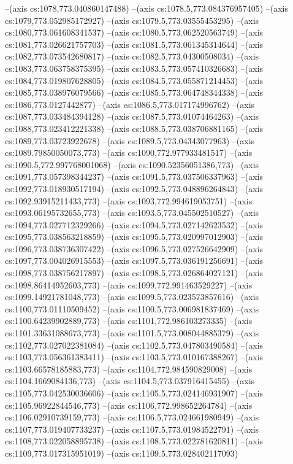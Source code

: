 --(axis cs:1078,773.040860147488)
--(axis cs:1078.5,773.084376957405)
--(axis cs:1079,773.052985172927)
--(axis cs:1079.5,773.03555453295)
--(axis cs:1080,773.061608341537)
--(axis cs:1080.5,773.062520563749)
--(axis cs:1081,773.026621757703)
--(axis cs:1081.5,773.061345314644)
--(axis cs:1082,773.073542680817)
--(axis cs:1082.5,773.04300508034)
--(axis cs:1083,773.063758375395)
--(axis cs:1083.5,773.057410326683)
--(axis cs:1084,773.019807628805)
--(axis cs:1084.5,773.055871214453)
--(axis cs:1085,773.038976079566)
--(axis cs:1085.5,773.064748344338)
--(axis cs:1086,773.0127442877)
--(axis cs:1086.5,773.017174996762)
--(axis cs:1087,773.033484394128)
--(axis cs:1087.5,773.01074464263)
--(axis cs:1088,773.023412221338)
--(axis cs:1088.5,773.038706881165)
--(axis cs:1089,773.03723922678)
--(axis cs:1089.5,773.04343077963)
--(axis cs:1089.79850050073,773)
--(axis cs:1090,772.977933481517)
--(axis cs:1090.5,772.997768001068)
--(axis cs:1090.52356051386,773)
--(axis cs:1091,773.057398344237)
--(axis cs:1091.5,773.037506337963)
--(axis cs:1092,773.018930517194)
--(axis cs:1092.5,773.048896264843)
--(axis cs:1092.93915211433,773)
--(axis cs:1093,772.994619053751)
--(axis cs:1093.06195732655,773)
--(axis cs:1093.5,773.045502510527)
--(axis cs:1094,773.027712329266)
--(axis cs:1094.5,773.027142623532)
--(axis cs:1095,773.038563218859)
--(axis cs:1095.5,773.020997012903)
--(axis cs:1096,773.038736307422)
--(axis cs:1096.5,773.027526642909)
--(axis cs:1097,773.004026915553)
--(axis cs:1097.5,773.036191256691)
--(axis cs:1098,773.038756217897)
--(axis cs:1098.5,773.026864027121)
--(axis cs:1098.86414952603,773)
--(axis cs:1099,772.991463529227)
--(axis cs:1099.14921781048,773)
--(axis cs:1099.5,773.023573857616)
--(axis cs:1100,773.01110509452)
--(axis cs:1100.5,773.006981837469)
--(axis cs:1100.64239902889,773)
--(axis cs:1101,772.986103273335)
--(axis cs:1101.33631088673,773)
--(axis cs:1101.5,773.008044885379)
--(axis cs:1102,773.027022381084)
--(axis cs:1102.5,773.047803490584)
--(axis cs:1103,773.056361383411)
--(axis cs:1103.5,773.010167388267)
--(axis cs:1103.66578185883,773)
--(axis cs:1104,772.984590829008)
--(axis cs:1104.1669084136,773)
--(axis cs:1104.5,773.037916415455)
--(axis cs:1105,773.042530036606)
--(axis cs:1105.5,773.024146931907)
--(axis cs:1105.96922844546,773)
--(axis cs:1106,772.998652264784)
--(axis cs:1106.02910739159,773)
--(axis cs:1106.5,773.024661980949)
--(axis cs:1107,773.019407733237)
--(axis cs:1107.5,773.01984522791)
--(axis cs:1108,773.022058895738)
--(axis cs:1108.5,773.022781620811)
--(axis cs:1109,773.017315951019)
--(axis cs:1109.5,773.028402117093)
